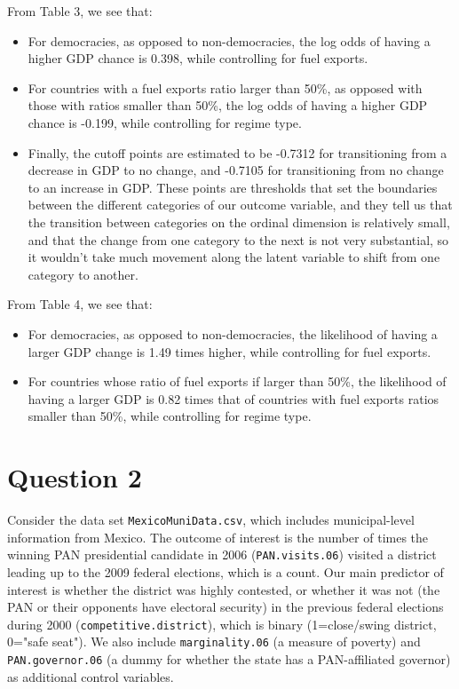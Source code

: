 \documentclass[12pt,letterpaper]{article}
\begin{document}
\begin{enumerate}
	\noindent From Table 3, we see that: 
	\begin{itemize}
		\item For democracies, as opposed to non-democracies, the log odds of having a higher GDP chance is 0.398, while controlling for fuel exports. 
		\item For countries with a fuel exports ratio larger than 50\%, as opposed with those with ratios smaller than 50\%, the log odds of having a higher GDP chance is -0.199, while controlling for regime type. 
		\item Finally, the cutoff points are estimated to be -0.7312 for transitioning from a decrease in GDP to no change, and -0.7105 for transitioning from no change to an increase in GDP. These points are thresholds that set the boundaries between the different categories of our outcome variable, and they tell us that the transition between categories on the ordinal dimension is relatively small, and that the change from one category to the next is not very substantial, so it wouldn't take much movement along the latent variable to shift from one category to another.
	\end{itemize}
	
	\noindent From Table 4, we see that: 
	\begin{itemize}
		\item For democracies, as opposed to non-democracies, the likelihood of having a larger GDP change is 1.49 times higher, while controlling for fuel exports. 
		\item For countries whose ratio of fuel exports if larger than 50\%, the likelihood of having a larger GDP is 0.82 times that of countries with fuel exports ratios smaller than 50\%, while controlling for regime type.  
	\end{itemize}
	
\end{enumerate}

\newpage
\section*{Question 2} 
\vspace{.25cm}

\noindent Consider the data set \texttt{MexicoMuniData.csv}, which includes municipal-level information from Mexico. The outcome of interest is the number of times the winning PAN presidential candidate in 2006 (\texttt{PAN.visits.06}) visited a district leading up to the 2009 federal elections, which is a count. Our main predictor of interest is whether the district was highly contested, or whether it was not (the PAN or their opponents have electoral security) in the previous federal elections during 2000 (\texttt{competitive.district}), which is binary (1=close/swing district, 0="safe seat"). We also include \texttt{marginality.06} (a measure of poverty) and \texttt{PAN.governor.06} (a dummy for whether the state has a PAN-affiliated governor) as additional control variables. 
\end{document}
